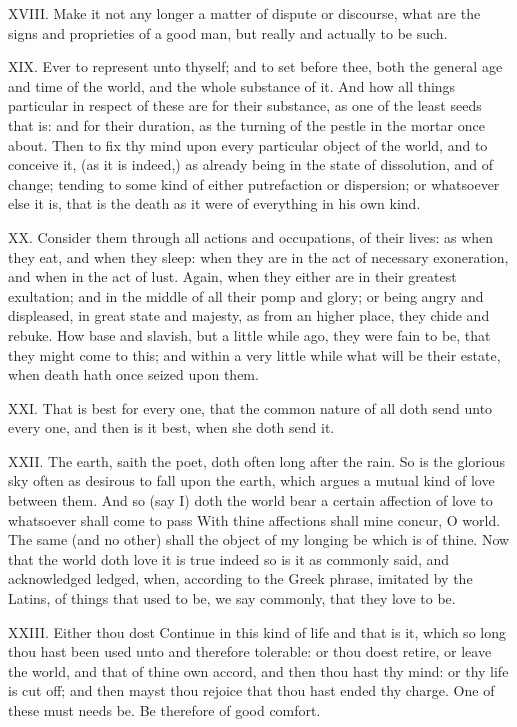 XVIII. Make it not any longer a matter of dispute or discourse, what are
the signs and proprieties of a good man, but really and actually to be
such.

XIX. Ever to represent unto thyself; and to set before thee, both the
general age and time of the world, and the whole substance of it. And how
all things particular in respect of these are for their substance, as one
of the least seeds that is: and for their duration, as the turning of the
pestle in the mortar once about. Then to fix thy mind upon every
particular object of the world, and to conceive it, (as it is indeed,) as
already being in the state of dissolution, and of change; tending to some
kind of either putrefaction or dispersion; or whatsoever else it is, that
is the death as it were of everything in his own kind.

XX. Consider them through all actions and occupations, of their lives:
as when they eat, and when they sleep: when they are in the act of
necessary exoneration, and when in the act of lust. Again, when they
either are in their greatest exultation; and in the middle of all their
pomp and glory; or being angry and displeased, in great state and majesty,
as from an higher place, they chide and rebuke. How base and slavish, but
a little while ago, they were fain to be, that they might come to this;
and within a very little while what will be their estate, when death hath
once seized upon them.

XXI. That is best for every one, that the common nature of all doth send
unto every one, and then is it best, when she doth send it.

XXII. The earth, saith the poet, doth often long after the rain. So is
the glorious sky often as desirous to fall upon the earth, which argues a
mutual kind of love between them. And so (say I) doth the world bear a
certain affection of love to whatsoever shall come to pass With thine
affections shall mine concur, O world. The same (and no other) shall the
object of my longing be which is of thine. Now that the world doth love it
is true indeed so is it as commonly said, and acknowledged ledged, when,
according to the Greek phrase, imitated by the Latins, of things that used
to be, we say commonly, that they love to be.

XXIII. Either thou dost Continue in this kind of life and that is it,
which so long thou hast been used unto and therefore tolerable: or thou
doest retire, or leave the world, and that of thine own accord, and then
thou hast thy mind: or thy life is cut off; and then mayst thou rejoice
that thou hast ended thy charge. One of these must needs be. Be therefore
of good comfort.

